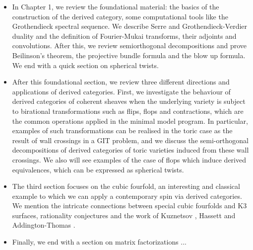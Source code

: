 \begin{itemize}
    \item In Chapter 1, we review the foundational material: the basics of the construction of the derived category, some computational tools like the Grothendieck spectral sequence. We describe Serre and Grothendieck-Verdier duality and the definition of Fourier-Mukai transforms, their adjoints and convolutions. After this, we review semiorthogonal decompositions and prove Beilinson's theorem, the projective bundle formula and the blow up formula. We end with a quick section on spherical twists.
    \item After this foundational section, we review three different directions and applications of derived categories. First, we investigate the behaviour of derived categories of coherent sheaves when the underlying variety is subject to birational transformations such as flips, flops and contractions, which are the common operations applied in the minimal model program. In particular, examples of such transformations can be realised in the toric case as the result of wall crossings in a GIT problem, and we  discuss the semi-orthogonal decompositions of derived categories of toric varieties induced from these wall crossings. We also will see examples of the case of flops which induce derived equivalences, which can be expressed as spherical twists. 
    \item The third section focuses on the cubic fourfold, an interesting and classical example to which we can apply a contemporary spin via derived categories. We mention the intricate connections between special cubic fourfolds and K3 surfaces, rationality conjectures and the work of Kuznetsov \cite{KuznetsovDerivedCubic}, Hassett \cite{hassett_special_2000} and Addington-Thomas \cite{addington_hodge_2014}. 
    \item Finally, we end with a section on matrix factorizations ...
\end{itemize}





